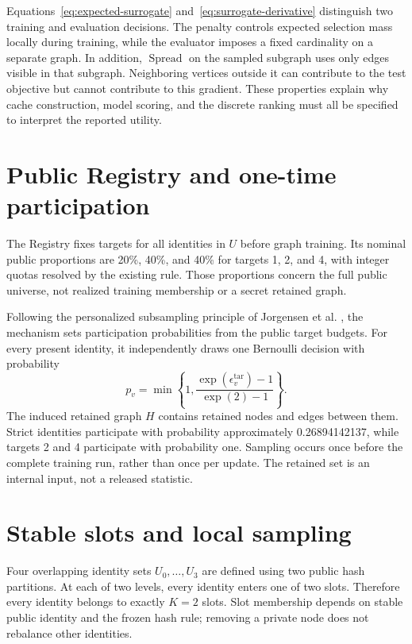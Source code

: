 Equations~\eqref{eq:expected-surrogate} and~\eqref{eq:surrogate-derivative} distinguish two training and evaluation decisions. The penalty controls expected selection mass locally during training, while the evaluator imposes a fixed cardinality on a separate graph. In addition, $\operatorname{Spread}$ on the sampled subgraph uses only edges visible in that subgraph. Neighboring vertices outside it can contribute to the test objective but cannot contribute to this gradient. These properties explain why cache construction, model scoring, and the discrete ranking must all be specified to interpret the reported utility.

\section{Public Registry and one-time participation}
The Registry fixes targets for all identities in $U$ before graph training. Its nominal public proportions are 20\%, 40\%, and 40\% for targets 1, 2, and 4, with integer quotas resolved by the existing rule. Those proportions concern the full public universe, not realized training membership or a secret retained graph.

Following the personalized subsampling principle of Jorgensen et al. \cite{jorgensen2015}, the mechanism sets participation probabilities from the public target budgets. For every present identity, it independently draws one Bernoulli decision with probability
\begin{equation}
 p_v=\min\left\{1,\frac{\exp(\epsilon^{\mathrm{tar}}_v)-1}{\exp(2)-1}\right\}.\label{eq:participation}
\end{equation}
The induced retained graph $H$ contains retained nodes and edges between them. Strict identities participate with probability approximately 0.26894142137, while targets 2 and 4 participate with probability one. Sampling occurs once before the complete training run, rather than once per update. The retained set is an internal input, not a released statistic.

\section{Stable slots and local sampling}
Four overlapping identity sets $U_0,\ldots,U_3$ are defined using two public hash partitions. At each of two levels, every identity enters one of two slots. Therefore every identity belongs to exactly $K=2$ slots. Slot membership depends on stable public identity and the frozen hash rule; removing a private node does not rebalance other identities.

